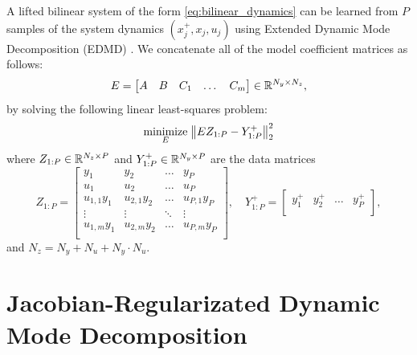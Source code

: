 \documentclass{article}
\begin{document}
A lifted bilinear system of the form \eqref{eq:bilinear_dynamics} can be learned from $P$
samples of the system dynamics $(x_j^+,x_j,u_j)$ using Extended Dynamic Mode Decomposition
(EDMD) \cite{Williams2015,Folkestad2021}. We concatenate all of the model coefficient
matrices as follows:
\begin{equation} \label{eq:E_matrixdef}
  E = \begin{bmatrix} A & B & C_1 & \dots & C_m \end{bmatrix} \in \mathbb{R}^{N_y \times N_z},
\end{equation}
by solving the following linear least-squares problem:
\begin{align} \label{opt:edmd}
  \underset{E}{\text{minimize}} \; \norm{E Z_{1:P} - Y_{1:P}^+}_2^2
\end{align}
where $Z_{1:P} \in \mathbb{R}^{N_z \times P}$ and $Y_{1:P}^+ \in \mathbb{R}^{N_y \times P}$ are the data 
matrices 
\begin{equation}
  Z_{1:P} = \begin{bmatrix}
    y_1         & y_2         & \dots  & y_P          \\
    u_1         & u_2         & \dots  & u_P          \\
    u_{1,1} y_1 & u_{2,1} y_2 & \dots  & u_{P,1} y_P  \\
    \vdots      & \vdots      & \ddots & \vdots       \\
    u_{1,m} y_1 & u_{2,m} y_2 & \dots  & u_{P,m} y_P  \\
  \end{bmatrix}, \quad 
  Y_{1:P}^+ = \begin{bmatrix}
    y_1^+         & y_2^+         & \dots  & y_P^+    \\
  \end{bmatrix},
\end{equation}
and $N_z = N_y + N_u + N_y \cdot N_u$.


\section{Jacobian-Regularizated Dynamic Mode Decomposition} \label{sec:jdmd}

\end{document}
